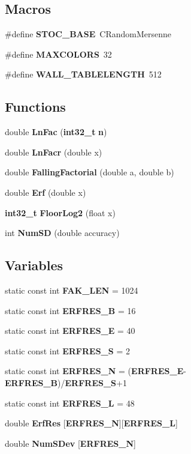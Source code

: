 \subsection*{Macros}
\begin{DoxyCompactItemize}
\item 
\#define {\bf S\-T\-O\-C\-\_\-\-B\-A\-S\-E}~C\-Random\-Mersenne
\item 
\#define {\bf M\-A\-X\-C\-O\-L\-O\-R\-S}~32
\item 
\#define {\bf W\-A\-L\-L\-\_\-\-T\-A\-B\-L\-E\-L\-E\-N\-G\-T\-H}~512
\end{DoxyCompactItemize}
\subsection*{Functions}
\begin{DoxyCompactItemize}
\item 
double {\bf Ln\-Fac} ({\bf int32\-\_\-t} {\bf n})
\item 
double {\bf Ln\-Facr} (double x)
\item 
double {\bf Falling\-Factorial} (double a, double b)
\item 
double {\bf Erf} (double x)
\item 
{\bf int32\-\_\-t} {\bf Floor\-Log2} (float x)
\item 
int {\bf Num\-S\-D} (double accuracy)
\end{DoxyCompactItemize}
\subsection*{Variables}
\begin{DoxyCompactItemize}
\item 
static const int {\bf F\-A\-K\-\_\-\-L\-E\-N} = 1024
\item 
static const int {\bf E\-R\-F\-R\-E\-S\-\_\-\-B} = 16
\item 
static const int {\bf E\-R\-F\-R\-E\-S\-\_\-\-E} = 40
\item 
static const int {\bf E\-R\-F\-R\-E\-S\-\_\-\-S} = 2
\item 
static const int {\bf E\-R\-F\-R\-E\-S\-\_\-\-N} = ({\bf E\-R\-F\-R\-E\-S\-\_\-\-E}-\/{\bf E\-R\-F\-R\-E\-S\-\_\-\-B})/{\bf E\-R\-F\-R\-E\-S\-\_\-\-S}+1
\item 
static const int {\bf E\-R\-F\-R\-E\-S\-\_\-\-L} = 48
\item 
double {\bf Erf\-Res} [{\bf E\-R\-F\-R\-E\-S\-\_\-\-N}][{\bf E\-R\-F\-R\-E\-S\-\_\-\-L}]
\item 
double {\bf Num\-S\-Dev} [{\bf E\-R\-F\-R\-E\-S\-\_\-\-N}]
\end{DoxyCompactItemize}


